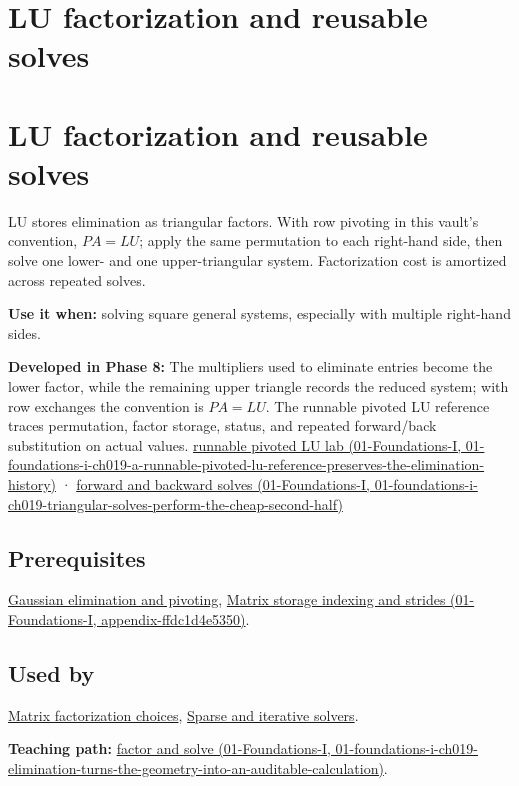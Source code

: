 \hypertarget{appendix-55e4b5b0a1e6}{}
\section*{LU factorization and reusable solves}
\section{LU factorization and reusable solves}\label{appendix-55e4b5b0a1e6-lu-factorization-and-reusable-solves}

LU stores elimination as triangular factors. With row pivoting in this vault's convention, \(PA=LU\); apply the same permutation to each right-hand side, then solve one lower- and one upper-triangular system. Factorization cost is amortized across repeated solves.

\textbf{Use it when:} solving square general systems, especially with multiple right-hand sides.

\textbf{Developed in Phase 8:} The multipliers used to eliminate entries become the lower factor, while the remaining upper triangle records the reduced system; with row exchanges the convention is \(PA=LU\). The runnable pivoted LU reference traces permutation, factor storage, status, and repeated forward/back substitution on actual values. \href{../01-Foundations-I/main.pdf\#nameddest=01-foundations-i-ch019-a-runnable-pivoted-lu-reference-preserves-the-elimination-history}{runnable pivoted LU lab (01-Foundations-I, 01-foundations-i-ch019-a-runnable-pivoted-lu-reference-preserves-the-elimination-history)} · \href{../01-Foundations-I/main.pdf\#nameddest=01-foundations-i-ch019-triangular-solves-perform-the-cheap-second-half}{forward and backward solves (01-Foundations-I, 01-foundations-i-ch019-triangular-solves-perform-the-cheap-second-half)}

\subsection{Prerequisites}\label{appendix-55e4b5b0a1e6-prerequisites}

\hyperref[appendix-f6e77f4a200f]{Gaussian elimination and pivoting}, \href{../01-Foundations-I/main.pdf\#nameddest=appendix-ffdc1d4e5350}{Matrix storage indexing and strides (01-Foundations-I, appendix-ffdc1d4e5350)}.

\subsection{Used by}\label{appendix-55e4b5b0a1e6-used-by}

\hyperref[appendix-221a483bec2d]{Matrix factorization choices}, \hyperref[appendix-67c87a3d9e94]{Sparse and iterative solvers}.

\textbf{Teaching path:} \href{../01-Foundations-I/main.pdf\#nameddest=01-foundations-i-ch019-elimination-turns-the-geometry-into-an-auditable-calculation}{factor and solve (01-Foundations-I, 01-foundations-i-ch019-elimination-turns-the-geometry-into-an-auditable-calculation)}.
